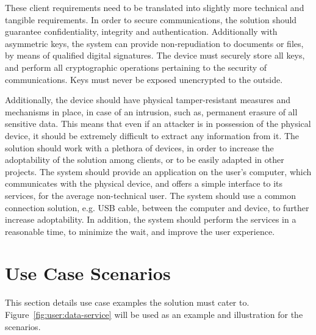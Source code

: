 These client requirements need to be translated into slightly more technical and tangible requirements. In order to secure communications, the solution should guarantee confidentiality, integrity and authentication.
Additionally with asymmetric keys, the system can provide non-repudiation to documents or files, by means of qualified digital signatures.
The device must securely store all keys, and perform all cryptographic operations pertaining to the security of communications. Keys must never be exposed unencrypted to the outside.

Additionally, the device should have physical tamper-resistant measures and mechanisms in place, in case of an intrusion, such as, permanent erasure of all sensitive data. 
This means that even if an attacker is in possession of the physical device, it should be extremely difficult to extract any information from it.
The solution should work with a plethora of devices, in order to increase the adoptability of the solution among clients, or to be easily adapted in other projects.
The system should provide an application on the user's computer, which communicates with the physical device, and offers a simple interface to its services, for the average non-technical user.
The system should use a common connection solution, e.g. USB cable, between the computer and device, to further increase adoptability.
In addition, the system should perform the services in a reasonable time, to minimize the wait, and improve the user experience.


\section{Use Case Scenarios}\label{chap:problem:scenarios}

This section details use case examples the solution must cater to. Figure~\ref{fig:user:data-service} will be used as an example and illustration for the scenarios.

